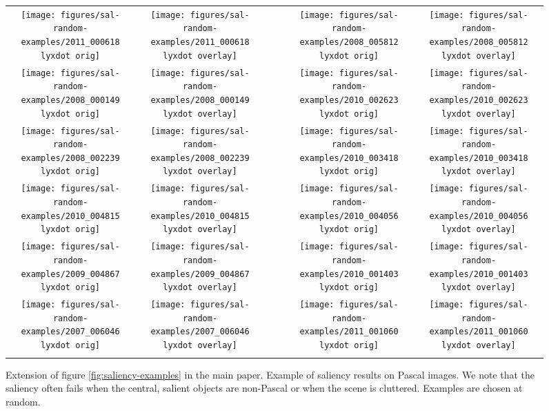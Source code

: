 \documentclass[british,10pt,twocolumn,letterpaper]{article}
\providecommand{\tabularnewline}{\\}
\newcommand{\lyxdot}{.}
\begin{document}
\begin{figure*}
\begin{centering}
\begin{tabular}{ccc|ccc}
\texttt{[image: figures/sal-random-examples/2011\_000618\\lyxdot orig]} & \texttt{[image: figures/sal-random-examples/2011\_000618\\lyxdot overlay]} &  &  & \texttt{[image: figures/sal-random-examples/2008\_005812\\lyxdot orig]} & \texttt{[image: figures/sal-random-examples/2008\_005812\\lyxdot overlay]}\tabularnewline
\texttt{[image: figures/sal-random-examples/2008\_000149\\lyxdot orig]} & \texttt{[image: figures/sal-random-examples/2008\_000149\\lyxdot overlay]} &  &  & \texttt{[image: figures/sal-random-examples/2010\_002623\\lyxdot orig]} & \texttt{[image: figures/sal-random-examples/2010\_002623\\lyxdot overlay]}\tabularnewline
\texttt{[image: figures/sal-random-examples/2008\_002239\\lyxdot orig]} & \texttt{[image: figures/sal-random-examples/2008\_002239\\lyxdot overlay]} &  &  & \texttt{[image: figures/sal-random-examples/2010\_003418\\lyxdot orig]} & \texttt{[image: figures/sal-random-examples/2010\_003418\\lyxdot overlay]}\tabularnewline
\texttt{[image: figures/sal-random-examples/2010\_004815\\lyxdot orig]} & \texttt{[image: figures/sal-random-examples/2010\_004815\\lyxdot overlay]} &  &  & \texttt{[image: figures/sal-random-examples/2010\_004056\\lyxdot orig]} & \texttt{[image: figures/sal-random-examples/2010\_004056\\lyxdot overlay]}\tabularnewline
\texttt{[image: figures/sal-random-examples/2009\_004867\\lyxdot orig]} & \texttt{[image: figures/sal-random-examples/2009\_004867\\lyxdot overlay]} &  &  & \texttt{[image: figures/sal-random-examples/2010\_001403\\lyxdot orig]} & \texttt{[image: figures/sal-random-examples/2010\_001403\\lyxdot overlay]}\tabularnewline
\texttt{[image: figures/sal-random-examples/2007\_006046\\lyxdot orig]} & \texttt{[image: figures/sal-random-examples/2007\_006046\\lyxdot overlay]} &  &  & \texttt{[image: figures/sal-random-examples/2011\_001060\\lyxdot orig]} & \texttt{[image: figures/sal-random-examples/2011\_001060\\lyxdot overlay]}\tabularnewline
 &  & \multicolumn{1}{c}{} &  &  & \tabularnewline
\end{tabular}
\par\end{centering}
\caption{\label{fig:saliency-qualitative-1}Extension of figure \ref{fig:saliency-examples} in the main
paper. Example of saliency results on Pascal images. We note that
the saliency often fails when the central, salient objects are non-Pascal
or when the scene is cluttered. Examples are chosen at random.}
\end{figure*}
\end{document}
